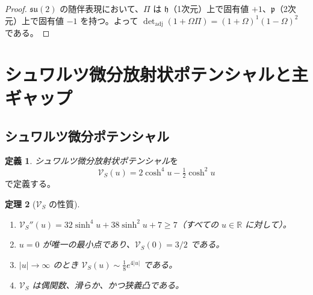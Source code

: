 \documentclass[12pt]{article}
\theoremstyle{plain}
\newtheorem{theorem}{定理}[section]
\theoremstyle{definition}
\newtheorem{definition}[theorem]{定義}
\numberwithin{equation}{section}
\newcommand{\R}{\mathbb{R}}
\newcommand{\fh}{\mathfrak{h}}
\newcommand{\fp}{\mathfrak{p}}
\begin{document}
\begin{proof}
$\mathfrak{su}(2)$ の随伴表現において、$\Pi$ は $\fh$（1次元）上で固有値 $+1$、$\fp$（2次元）上で固有値 $-1$ を持つ。よって $\det_{\mathrm{adj}}(1+\Omega\Pi)=(1+\Omega)^1(1-\Omega)^2$ である。
\end{proof}

\section{シュワルツ微分放射状ポテンシャルと主ギャップ}\label{sec:principalgap}

\subsection{シュワルツ微分ポテンシャル}

\begin{definition}
\emph{シュワルツ微分放射状ポテンシャル}を
\begin{equation}
\mathcal{V}_S(u) = 2\cosh^4 u - \tfrac{1}{2}\cosh^2 u
\end{equation}
で定義する。
\end{definition}

\begin{theorem}[$\mathcal{V}_S$ の性質]\label{thm:VSprops}
\begin{enumerate}[label=(\roman*)]
\item $\mathcal{V}_S''(u) = 32\sinh^4 u + 38\sinh^2 u + 7 \geq 7$（すべての $u\in\R$ に対して）。
\item $u=0$ が唯一の最小点であり、$\mathcal{V}_S(0)=3/2$ である。
\item $|u|\to\infty$ のとき $\mathcal{V}_S(u)\sim\frac{1}{8}e^{4|u|}$ である。
\item $\mathcal{V}_S$ は偶関数、滑らか、かつ狭義凸である。
\end{enumerate}
\end{theorem}
\end{document}
